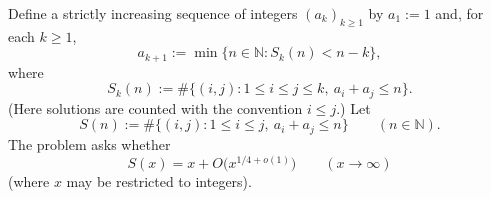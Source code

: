 Define a strictly increasing sequence of integers $(a_k)_{k\ge 1}$ by
$a_1:=1$ and, for each $k\ge 1$,
\[
 a_{k+1}:=\min\{n\in\mathbb{N}: S_k(n) < n-k\},
\]
where
\[
S_k(n):=\#\{(i,j):1\le i\le j\le k,\ a_i+a_j\le n\}.
\]
(Here solutions are counted with the convention $i\le j$.)
Let
\[
S(n):=\#\{(i,j):1\le i\le j,\ a_i+a_j\le n\}\qquad(n\in\mathbb{N}).
\]
The problem asks whether
\[
S(x)=x+O\bigl(x^{1/4+o(1)}\bigr)\qquad(x\to\infty)
\]
(where $x$ may be restricted to integers).
